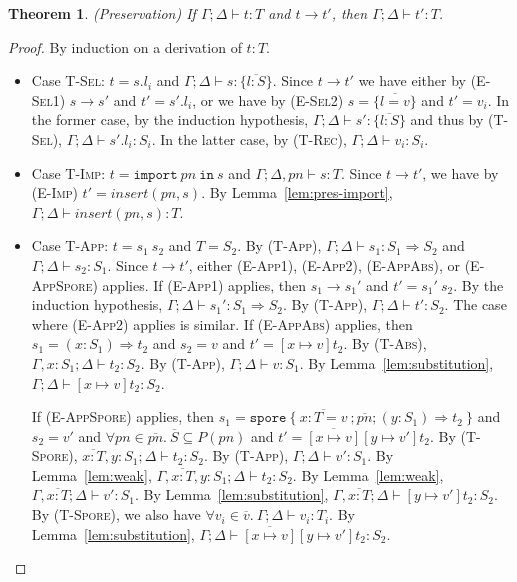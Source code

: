 \documentclass[a4paper,twoside]{article}
\newcommand{\seq}[1]{\overline{#1}}
\newtheorem{theorem}{Theorem}[section]
\begin{document}
\begin{theorem}
\emph{(Preservation)}
\label{th:pres}
If $\Gamma ; \Delta \vdash t : T$ and $t \rightarrow t'$, then $\Gamma ; \Delta \vdash t' : T$.
\end{theorem}
\begin{proof}
By induction on a derivation of $t : T$.

\begin{itemize}

\item Case \textsc{T-Sel}: $t = s.l_i$ and $\Gamma ; \Delta \vdash s : \{\seq{l : S}\}$. Since $t \rightarrow t'$ we have either by (\textsc{E-Sel1}) $s \rightarrow s'$ and $t' = s'.l_i$, or we have by (\textsc{E-Sel2}) $s = \{\seq{l = v}\}$ and $t' = v_i$. In the former case, by the induction hypothesis, $\Gamma ; \Delta \vdash s' : \{\seq{l : S}\}$ and thus by (\textsc{T-Sel}), $\Gamma ; \Delta \vdash s'.l_i : S_i$. In the latter case, by (\textsc{T-Rec}), $\Gamma ; \Delta \vdash v_i : S_i$.

\item Case \textsc{T-Imp}: $t = \texttt{import}~pn~\texttt{in}~s$ and $\Gamma ; \Delta, pn \vdash s : T$. Since $t \rightarrow t'$, we have by (\textsc{E-Imp}) $t' = insert(pn, s)$. By Lemma~\ref{lem:pres-import}, $\Gamma ; \Delta \vdash insert(pn, s) : T$.

\item Case \textsc{T-App}: $t = s_1~s_2$ and $T = S_2$. By (\textsc{T-App}), $\Gamma ; \Delta \vdash s_1 : S_1 \Rightarrow S_2$ and $\Gamma ; \Delta \vdash s_2 : S_1$. Since $t \rightarrow t'$, either (\textsc{E-App1}), (\textsc{E-App2}), (\textsc{E-AppAbs}), or (\textsc{E-AppSpore}) applies. If (\textsc{E-App1}) applies, then $s_1 \rightarrow s_1'$ and $t' = s_1'~s_2$. By the induction hypothesis, $\Gamma ; \Delta \vdash s_1' : S_1 \Rightarrow S_2$. By (\textsc{T-App}), $\Gamma ; \Delta \vdash t' : S_2$. The case where (\textsc{E-App2}) applies is similar. If (\textsc{E-AppAbs}) applies, then $s_1 = (x : S_1) \Rightarrow t_2$ and $s_2 = v$ and $t' = [x \mapsto v]t_2$. By (\textsc{T-Abs}), $\Gamma, x:S_1 ; \Delta \vdash t_2 : S_2$. By (\textsc{T-App}), $\Gamma ; \Delta \vdash v : S_1$. By Lemma~\ref{lem:substitution}, $\Gamma ; \Delta \vdash [x \mapsto v]t_2 : S_2$.

If (\textsc{E-AppSpore}) applies, then $s_1 = \texttt{spore}~\{~\seq{x : T = v}~; \seq{pn}; (y: S_1) \Rightarrow t_2~\}$ and $s_2 = v'$ and $\forall pn \in \seq{pn}.~\seq{S} \subseteq P(pn)$ and $t' = \seq{[x \mapsto v]}[y \mapsto v']t_2$. By (\textsc{T-Spore}), $\seq{x:T}, y:S_1 ; \Delta \vdash t_2 : S_2$. By (\textsc{T-App}), $\Gamma ; \Delta \vdash v' : S_1$. By Lemma~\ref{lem:weak}, $\Gamma, \seq{x:T}, y:S_1 ; \Delta \vdash t_2 : S_2$. By Lemma~\ref{lem:weak}, $\Gamma, \seq{x:T} ; \Delta \vdash v' : S_1$. By Lemma~\ref{lem:substitution}, $\Gamma, \seq{x:T} ; \Delta \vdash [y \mapsto v']t_2 : S_2$. By (\textsc{T-Spore}), we also have $\forall v_i \in \seq{v}.~\Gamma ; \Delta \vdash v_i : T_i$. By Lemma~\ref{lem:substitution}, $\Gamma ; \Delta \vdash \seq{[x \mapsto v]}[y \mapsto v']t_2 : S_2$.


\end{itemize}
\end{proof}
\end{document}
